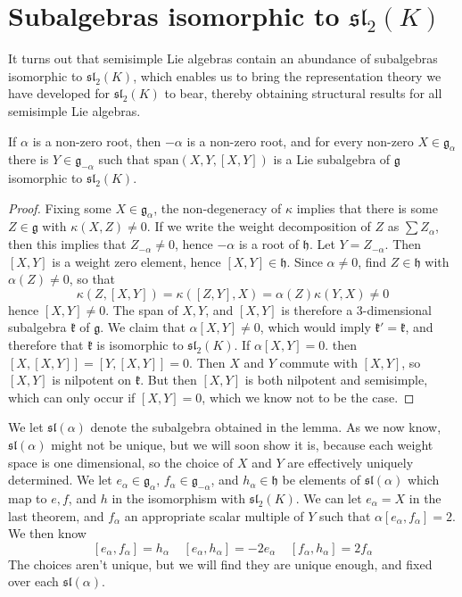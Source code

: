 \section{Subalgebras isomorphic to $\mathfrak{sl}_2(K)$}

It turns out that semisimple Lie algebras contain an abundance of subalgebras isomorphic to $\mathfrak{sl}_2(K)$, which enables us to bring the representation theory we have developed for $\mathfrak{sl}_2(K)$ to bear, thereby obtaining structural results for all semisimple Lie algebras.

\begin{lemma}
    If $\alpha$ is a non-zero root, then $-\alpha$ is a non-zero root, and for every non-zero $X \in \mathfrak{g}_\alpha$ there is $Y \in \mathfrak{g}_{-\alpha}$ such that $\text{span}(X,Y,[X,Y])$ is a Lie subalgebra of $\mathfrak{g}$ isomorphic to $\mathfrak{sl}_2(K)$.
\end{lemma}
\begin{proof}
    Fixing some $X \in \mathfrak{g}_\alpha$, the non-degeneracy of $\kappa$ implies that there is some $Z \in \mathfrak{g}$ with $\kappa(X,Z) \neq 0$. If we write the weight decomposition of $Z$ as $\sum Z_\alpha$, then this implies that $Z_{-\alpha} \neq 0$, hence $-\alpha$ is a root of $\mathfrak{h}$. Let $Y = Z_{-\alpha}$. Then $[X,Y]$ is a weight zero element, hence $[X,Y] \in \mathfrak{h}$. Since $\alpha \neq 0$, find $Z \in \mathfrak{h}$ with $\alpha(Z) \neq 0$, so that
    \[ \kappa(Z,[X,Y]) = \kappa([Z,Y],X) = \alpha(Z) \kappa(Y,X) \neq 0 \]
    hence $[X,Y] \neq 0$. The span of $X, Y$, and $[X,Y]$ is therefore a 3-dimensional subalgebra $\mathfrak{k}$ of $\mathfrak{g}$. We claim that $\alpha [X,Y] \neq 0$, which would imply $\mathfrak{k}' = \mathfrak{k}$, and therefore that $\mathfrak{k}$ is isomorphic to $\mathfrak{sl}_2(K)$. If $\alpha [X,Y] = 0$. then $[X,[X,Y]] = [Y,[X,Y]] = 0$. Then $X$ and $Y$ commute with $[X,Y]$, so $[X,Y]$ is nilpotent on $\mathfrak{k}$. But then $[X,Y]$ is both nilpotent and semisimple, which can only occur if $[X,Y] = 0$, which we know not to be the case.
\end{proof}

We let $\mathfrak{sl}(\alpha)$ denote the subalgebra obtained in the lemma. As we now know, $\mathfrak{sl}(\alpha)$ might not be unique, but we will soon show it is, because each weight space is one dimensional, so the choice of $X$ and $Y$ are effectively uniquely determined. We let $e_\alpha \in \mathfrak{g}_\alpha$, $f_\alpha \in \mathfrak{g}_{-\alpha}$, and $h_\alpha \in \mathfrak{h}$ be elements of $\mathfrak{sl}(\alpha)$ which map to $e,f$, and $h$ in the isomorphism with $\mathfrak{sl}_2(K)$. We can let $e_\alpha = X$ in the last theorem, and $f_\alpha$ an appropriate scalar multiple of $Y$ such that $\alpha [e_\alpha, f_\alpha] = 2$. We then know
%
\[ [e_\alpha, f_\alpha] = h_\alpha\ \ \ \ \ [e_\alpha, h_\alpha] = - 2 e_\alpha\ \ \ \ \ [f_\alpha, h_\alpha] = 2 f_\alpha \]
%
The choices aren't unique, but we will find they are unique enough, and fixed over each $\mathfrak{sl}(\alpha)$.

